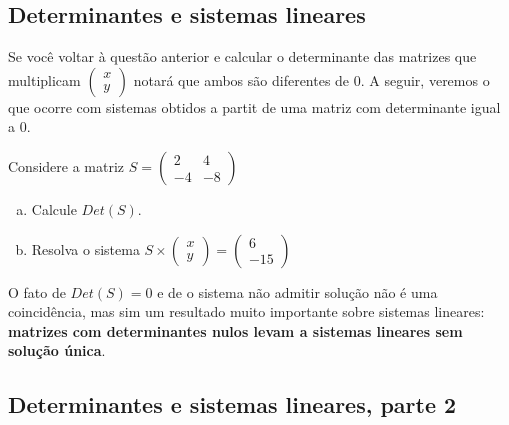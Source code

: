 \documentclass[main_estudante.tex]{subfiles}
\begin{document}
\subsection*{Determinantes e sistemas lineares}

Se você voltar à questão anterior e calcular o determinante das matrizes que multiplicam $\begin{pmatrix}x \\ y\end{pmatrix}$ notará que ambos são diferentes de 0. A seguir, veremos o que ocorre com sistemas obtidos a partit de uma matriz com determinante igual a 0.

\begin{questao}
Considere a matriz $S=\begin{pmatrix}2 & 4 \\ -4 & -8\end{pmatrix}$
\begin{enumerate}[a)]
\item Calcule $Det(S)$.
\item Resolva o sistema $S \times \begin{pmatrix}x \\ y\end{pmatrix} = \begin{pmatrix}6 \\ -15\end{pmatrix}$
\end{enumerate}
\end{questao}

O fato de $Det(S)=0$ e de o sistema não admitir solução não é uma coincidência, mas sim um resultado muito importante sobre sistemas lineares: \textbf{matrizes com determinantes nulos levam a sistemas lineares sem solução única}.

\subsection*{Determinantes e sistemas lineares, parte 2}
\end{document}

